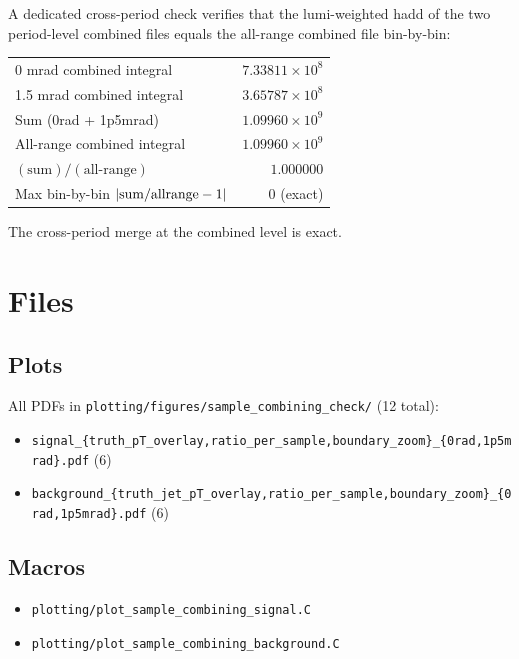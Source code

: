 \documentclass[11pt,a4paper]{article}
\begin{document}
A dedicated cross-period check verifies that the lumi-weighted hadd of the two period-level combined files equals the all-range combined file bin-by-bin:
\begin{center}
\begin{tabular}{lr}
\toprule
0 mrad combined integral      & $7.33811\times10^{8}$ \\
1.5 mrad combined integral    & $3.65787\times10^{8}$ \\
Sum (0rad + 1p5mrad)          & $1.09960\times10^{9}$ \\
All-range combined integral   & $1.09960\times10^{9}$ \\
$(\mathrm{sum}) / (\mathrm{all\text{-}range})$ & $1.000000$ \\
Max bin-by-bin $|{\rm sum/allrange} - 1|$  & $0$ (exact) \\
\bottomrule
\end{tabular}
\end{center}

The cross-period merge at the combined level is exact.

\section{Files}

\subsection{Plots}

All PDFs in \texttt{plotting/figures/sample\_combining\_check/} (12 total):
\begin{itemize}
  \item \texttt{signal\_\{truth\_pT\_overlay,ratio\_per\_sample,boundary\_zoom\}\_\{0rad,1p5mrad\}.pdf} (6)
  \item \texttt{background\_\{truth\_jet\_pT\_overlay,ratio\_per\_sample,boundary\_zoom\}\_\{0rad,1p5mrad\}.pdf} (6)
\end{itemize}

\subsection{Macros}
\begin{itemize}
  \item \texttt{plotting/plot\_sample\_combining\_signal.C}
  \item \texttt{plotting/plot\_sample\_combining\_background.C}
\end{itemize}
\end{document}
